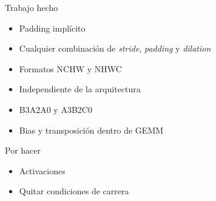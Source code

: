 \documentclass[aspectratio=43]{beamer}
\begin{document}
\begin{frame}
    \begin{block}{Trabajo hecho}
    \begin{itemize}
        \item Padding implícito
        \item Cualquier combinación de \emph{stride}, \emph{padding} y \emph{dilation}
        \item Formatos NCHW y NHWC
        \item Independiente de la arquitectura
        \item B3A2A0 y A3B2C0
        \item Bias y transposición dentro de GEMM
    \end{itemize}
    \end{block}

    \begin{block}{Por hacer}
    \begin{itemize}
        \item Activaciones
        \item Quitar condiciones de carrera
    \end{itemize}
    \end{block}
\end{frame}
\end{document}
